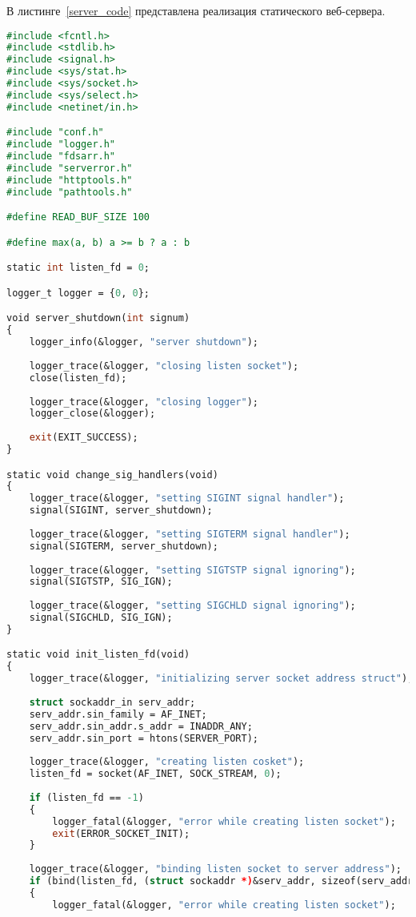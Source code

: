 В листинге~\ref{server_code} представлена реализация статического веб-сервера.
\begin{lstlisting}[label=server_code,caption=Реализация статического веб-сервера,language=Caml]
#include <fcntl.h>
#include <stdlib.h>
#include <signal.h>
#include <sys/stat.h>
#include <sys/socket.h>
#include <sys/select.h>
#include <netinet/in.h>

#include "conf.h"
#include "logger.h"
#include "fdsarr.h"
#include "serverror.h"
#include "httptools.h"
#include "pathtools.h"

#define READ_BUF_SIZE 100

#define max(a, b) a >= b ? a : b

static int listen_fd = 0;

logger_t logger = {0, 0};

void server_shutdown(int signum)
{
	logger_info(&logger, "server shutdown");
	
	logger_trace(&logger, "closing listen socket");
	close(listen_fd);
	
	logger_trace(&logger, "closing logger");
	logger_close(&logger);
	
	exit(EXIT_SUCCESS);
}

static void change_sig_handlers(void)
{
	logger_trace(&logger, "setting SIGINT signal handler");
	signal(SIGINT, server_shutdown);
	
	logger_trace(&logger, "setting SIGTERM signal handler");
	signal(SIGTERM, server_shutdown);
	
	logger_trace(&logger, "setting SIGTSTP signal ignoring");
	signal(SIGTSTP, SIG_IGN);
	
	logger_trace(&logger, "setting SIGCHLD signal ignoring");
	signal(SIGCHLD, SIG_IGN);
}

static void init_listen_fd(void)
{
	logger_trace(&logger, "initializing server socket address struct");
	
	struct sockaddr_in serv_addr;
	serv_addr.sin_family = AF_INET;
	serv_addr.sin_addr.s_addr = INADDR_ANY;
	serv_addr.sin_port = htons(SERVER_PORT);
	
	logger_trace(&logger, "creating listen cosket");
	listen_fd = socket(AF_INET, SOCK_STREAM, 0);
	
	if (listen_fd == -1)
	{
		logger_fatal(&logger, "error while creating listen socket");
		exit(ERROR_SOCKET_INIT);
	}
	
	logger_trace(&logger, "binding listen socket to server address");
	if (bind(listen_fd, (struct sockaddr *)&serv_addr, sizeof(serv_addr)) == -1)
	{
		logger_fatal(&logger, "error while creating listen socket");
		

\end{lstlisting}
